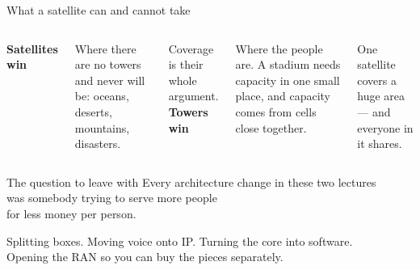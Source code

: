 \begin{frame}{What a satellite can and cannot take}
  \vspace{0.4em}
  \begin{columns}[T,onlytextwidth]
      \large\textbf{\textcolor{softgreen}{Satellites win}}

      \vspace{0.5em}
      \small
      Where there are no towers and never will be: oceans, deserts,
      mountains, disasters.

      \vspace{0.5em}
      Coverage is their whole argument.
      \large\textbf{\textcolor{coreorange}{Towers win}}

      \vspace{0.5em}
      \small
      Where the people are. A stadium needs capacity in one small place,
      and capacity comes from cells close together.

      \vspace{0.5em}
      One satellite covers a huge area --- and everyone in it shares.
  \end{columns}

  \vspace{0.9em}
\end{frame}

\begin{frame}{The question to leave with}
  \vspace{1.0em}
  \centering
  \Large
  Every architecture change in these two lectures\\
  was somebody trying to serve more people\\
  for less money per person.

  \vspace{1.4em}
  \normalsize
  Splitting boxes. Moving voice onto IP. Turning the core into software.\\
  Opening the RAN so you can buy the pieces separately.

  \vspace{1.4em}
\end{frame}
